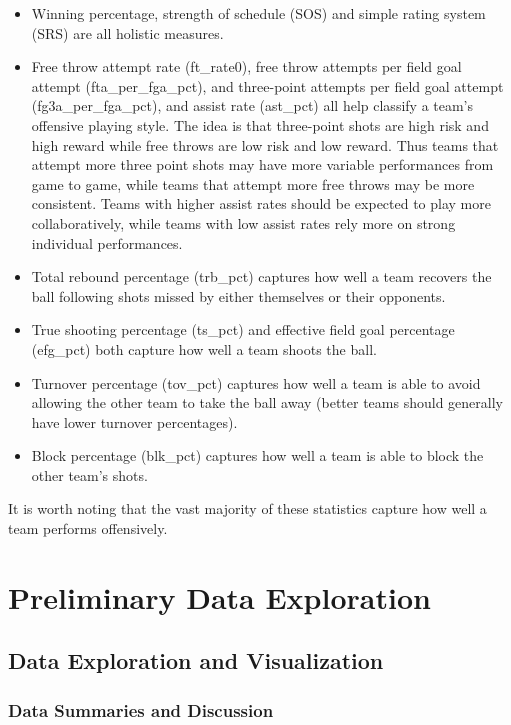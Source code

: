 \documentclass[10pt,a4paper, hidelinks]{article} %
\begin{document}
\begin{itemize}
	\item Winning percentage, strength of schedule (SOS) and simple rating system (SRS) are all holistic measures.
	\item Free throw attempt rate (ft\_rate0), free throw attempts per field goal attempt (fta\_per\_fga\_pct), and three-point attempts per field goal attempt (fg3a\_per\_fga\_pct), and assist rate (ast\_pct) all help classify a team's offensive playing style. The idea is that three-point shots are high risk and high reward while free throws are low risk and low reward. Thus teams that attempt more three point shots may have more variable performances from game to game, while teams that attempt more free throws may be more consistent. Teams with higher assist rates should be expected to play more collaboratively, while teams with low assist rates rely more on strong individual performances.
	\item Total rebound percentage (trb\_pct) captures how well a team recovers the ball following shots missed by either themselves or their opponents.
	\item True shooting percentage (ts\_pct) and effective field goal percentage (efg\_pct) both capture how well a team shoots the ball.
	\item Turnover percentage (tov\_pct) captures how well a team is able to avoid allowing the other team to take the ball away (better teams should generally have lower turnover percentages).
	\item Block percentage (blk\_pct)  captures how well a team is able to block the other team's shots.
\end{itemize}

It is worth noting that the vast majority of these statistics capture how well a team performs offensively.  

\section{Preliminary Data Exploration}

\subsection{Data Exploration and Visualization}

\subsubsection{Data Summaries and Discussion}
\end{document}
